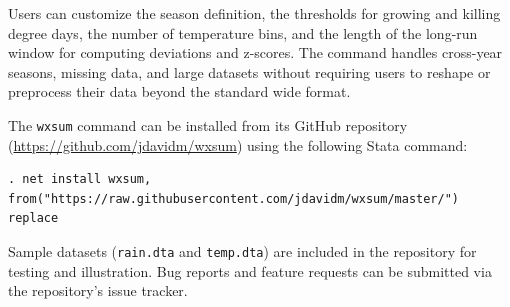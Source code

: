 Users can customize the season definition, the thresholds for growing and killing degree days, the number of temperature bins, and the length of the long-run window for computing deviations and z-scores. The command handles cross-year seasons, missing data, and large datasets without requiring users to reshape or preprocess their data beyond the standard wide format.

The \texttt{wxsum} command can be installed from its GitHub repository (\url{https://github.com/jdavidm/wxsum}) using the following Stata command:

\begin{stverbatim}
\begin{verbatim}
. net install wxsum, from("https://raw.githubusercontent.com/jdavidm/wxsum/master/") replace
\end{verbatim}
\end{stverbatim}

\noindent Sample datasets (\texttt{rain.dta} and \texttt{temp.dta}) are included in the repository for testing and illustration. Bug reports and feature requests can be submitted via the repository's issue tracker.

\endinput
